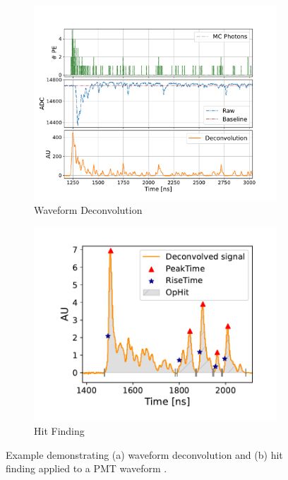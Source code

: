 \begin{figure}[b!]
        \centering
        \begin{subfigure}[b]{0.59\textwidth}
            \centering
            \includegraphics[width=\textwidth]{pds_reco_deconvolution}
            \caption{Waveform Deconvolution}
            \label{fig:pds_reco_deconvolution}
        \end{subfigure}
        \hfill
        \begin{subfigure}[b]{0.4\textwidth}  
            \centering 
            \includegraphics[width=\textwidth]{pds_reco_hit_finding}
            \caption{Hit Finding}
            \label{fig:pds_reco_hit_finding}
        \end{subfigure}
        \caption[Waveform Deconvolution and Hit Finding on PMT Waveforms]{
	Example demonstrating (a) waveform deconvolution and (b) hit finding applied to a PMT waveform \cite{sbnd_pds_paper}.
	}
        \label{fig:pds_reco}
\end{figure}


